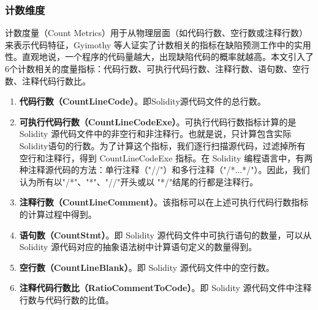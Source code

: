 \subsubsection{计数维度}
计数度量（Count Metrics）用于从物理层面（如代码行数、空行数或注释行数）来表示代码特征，Gyimothy 等人\cite{gyimothy2005}证实了计数相关的指标在缺陷预测工作中的实用性。直观地说，一个程序的代码量越大，出现缺陷代码的概率就越高。本文引入了6个计数相关的度量指标：代码行数、可执行代码行数、注释行数、语句数、空行数、注释代码行数比。
\begin{enumerate}[label=\Alph*., align=left, leftmargin=*]
    \item \textbf{代码行数（CountLineCode）}。即Solidity源代码文件的总行数。

    \item \textbf{可执行代码行数（CountLineCodeExe）}。可执行代码行数指标计算的是 Solidity 源代码文件中的非空行和非注释行。也就是说，只计算包含实际Solidity语句的行数。为了计算这个指标，我们逐行扫描源代码，过滤掉所有空行和注释行，得到 CountLineCodeExe 指标。在 Solidity 编程语言中，有两种注释源代码的方法：单行注释（"//"）和多行注释（"/*...*/"）。因此，我们认为所有以"/*"、"*"、"//"开头或以 "*/"结尾的行都是注释行。
    
    \item \textbf{注释行数（CountLineComment）}。该指标可以在上述可执行代码行数指标的计算过程中得到。
    
    \item \textbf{语句数（CountStmt）}。即 Solidity 源代码文件中可执行语句的数量，可以从 Solidity 源代码对应的抽象语法树中计算语句定义的数量得到。
    
    \item \textbf{空行数（CountLineBlank）}。即 Solidity 源代码文件中的空行数。
    
    \item \textbf{注释代码行数比（RatioCommentToCode）}。即 Solidity 源代码文件中注释行数与代码行数的比值。
\end{enumerate}
